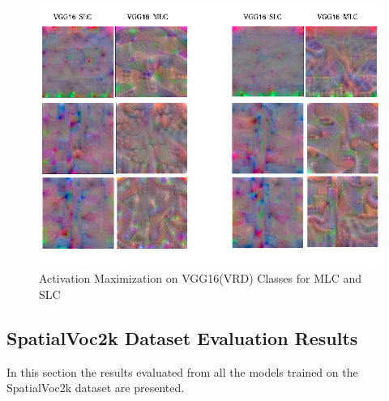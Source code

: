 \documentclass{csfyp}
\begin{document}
\begin{figure}[!htbp]
	\includegraphics[scale=0.60,center]{NewVRD.pdf}
	\caption{Activation Maximization on VGG16(VRD) Classes for MLC and SLC}
	\vspace{-4mm}
\end{figure}
\newpage
\subsection{SpatialVoc2k Dataset Evaluation Results}
In this section the results evaluated from all the models trained on the SpatialVoc2k dataset are presented.
\end{document}
